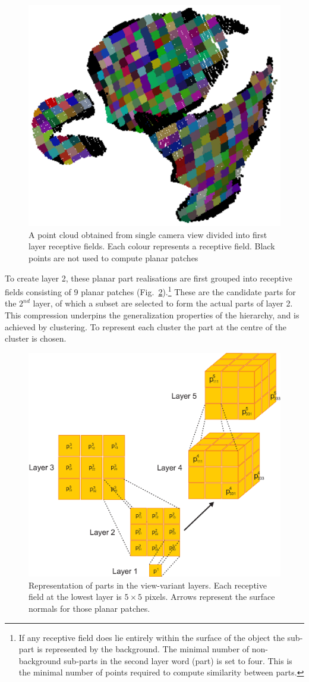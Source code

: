 \documentclass[letterpaper,10pt,conference]{ieeeconf}  %
\begin{document}
\begin{figure}[t]
 \centering
\includegraphics[width=0.5\columnwidth]{../images/recFields1.eps}
\caption{A point cloud obtained from single camera view divided into first layer receptive fields. Each colour represents a receptive field. Black points are not used to compute planar patches}
 \label{recFields1}
\end{figure}

To create layer 2, these planar part realisations are first grouped into receptive fields consisting of 9 planar patches (Fig.~\ref{word}).\footnote{If any receptive field does lie entirely within the surface of the object the sub-part is represented by the background. The minimal number of non-background sub-parts in the second layer word (part) is set to four. This is the minimal number of points required to compute similarity between parts.} These are the candidate parts for the $2^{nd}$ layer, of which a subset are selected to form the actual parts of layer 2. This compression underpins the generalization properties of the hierarchy, and is achieved by clustering. To represent each cluster the part at the centre of the cluster is chosen.

\begin{figure}[t]
 \centering
\includegraphics[width=0.9\columnwidth]{../images/hierarchy.eps}
\caption{Representation of parts in the view-variant layers. Each receptive field at the lowest layer is $5 \times 5$ pixels. Arrows represent the surface normals for those planar patches.}
 \label{word}
\end{figure}
\end{document}
